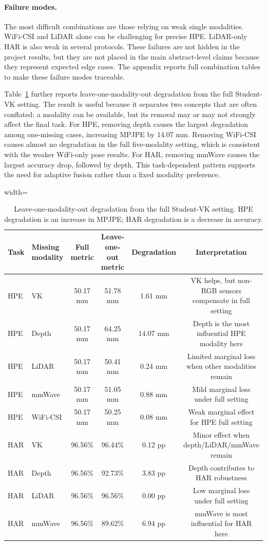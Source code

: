 \documentclass[preprint,12pt]{elsarticle}
\newcommand{\mpjpe}{MPJPE}
\begin{document}
\paragraph{Failure modes.}
The most difficult combinations are those relying on weak single modalities. WiFi-CSI and LiDAR alone can be challenging for precise HPE. LiDAR-only HAR is also weak in several protocols. These failures are not hidden in the project results, but they are not placed in the main abstract-level claims because they represent expected edge cases. The appendix reports full combination tables to make these failure modes traceable.

Table~\ref{tab:leave_one} further reports leave-one-modality-out degradation from the full Student-VK setting. The result is useful because it separates two concepts that are often conflated: a modality can be available, but its removal may or may not strongly affect the final task. For HPE, removing depth causes the largest degradation among one-missing cases, increasing \mpjpe{} by 14.07 mm. Removing WiFi-CSI causes almost no degradation in the full five-modality setting, which is consistent with the weaker WiFi-only pose results. For HAR, removing mmWave causes the largest accuracy drop, followed by depth. This task-dependent pattern supports the need for adaptive fusion rather than a fixed modality preference.

\begin{table}[t]
\centering
\caption{Leave-one-modality-out degradation from the full Student-VK setting. HPE degradation is an increase in \mpjpe{}; HAR degradation is a decrease in accuracy.}
\label{tab:leave_one}
\begin{adjustbox}{width=\textwidth}
\begin{tabular}{llcccc}
\toprule
Task & Missing modality & Full metric & Leave-one-out metric & Degradation & Interpretation \\
\midrule
HPE & VK & 50.17 mm & 51.78 mm & 1.61 mm & VK helps, but non-RGB sensors compensate in full setting \\
HPE & Depth & 50.17 mm & 64.25 mm & 14.07 mm & Depth is the most influential HPE modality here \\
HPE & LiDAR & 50.17 mm & 50.41 mm & 0.24 mm & Limited marginal loss when other modalities remain \\
HPE & mmWave & 50.17 mm & 51.05 mm & 0.88 mm & Mild marginal loss under full setting \\
HPE & WiFi-CSI & 50.17 mm & 50.25 mm & 0.08 mm & Weak marginal effect for HPE full setting \\
\midrule
HAR & VK & 96.56\% & 96.44\% & 0.12 pp & Minor effect when depth/LiDAR/mmWave remain \\
HAR & Depth & 96.56\% & 92.73\% & 3.83 pp & Depth contributes to HAR robustness \\
HAR & LiDAR & 96.56\% & 96.56\% & 0.00 pp & Low marginal loss under full setting \\
HAR & mmWave & 96.56\% & 89.62\% & 6.94 pp & mmWave is most influential for HAR here \\
\bottomrule
\end{tabular}
\end{adjustbox}
\end{table}
\end{document}
